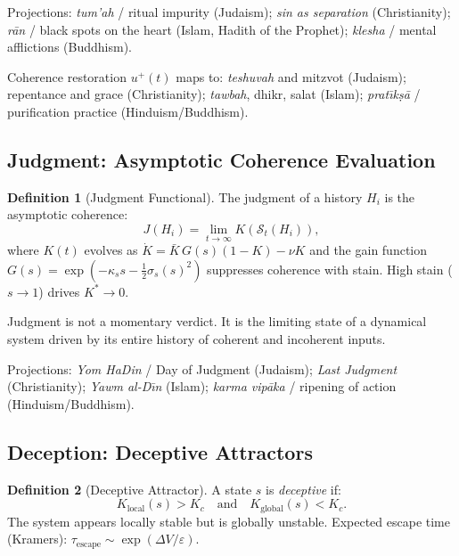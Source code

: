 \documentclass[12pt,oneside]{book}
\theoremstyle{definition}
\newtheorem{definition}{Definition}[chapter]
\begin{document}
\noindent Projections: \textit{tum'ah} / ritual impurity (Judaism);
\textit{sin as separation} (Christianity); \textit{r\={a}n} / black spots on the
heart (Islam, Hadith of the Prophet); \textit{klesha} / mental afflictions (Buddhism).

Coherence restoration $u^+(t)$ maps to: \textit{teshuvah} and mitzvot (Judaism);
repentance and grace (Christianity); \textit{tawbah}, dhikr, salat (Islam);
\textit{prat\={\i}k\d{s}\={a}} / purification practice (Hinduism/Buddhism).

\subsection{Judgment: Asymptotic Coherence Evaluation}

\begin{definition}[Judgment Functional]
  The judgment of a history $H_i$ is the asymptotic coherence:
  \begin{equation}
    J(H_i) = \lim_{t\to\infty} K(\mathcal{S}_t(H_i)),
  \end{equation}
  where $K(t)$ evolves as $\dot{K} = \bar{K}\,G(s)(1-K) - \nu K$ and the
  gain function $G(s) = \exp(-\kappa_s s - \tfrac{1}{2}\sigma_s(s)^2)$
  suppresses coherence with stain. High stain ($s\to1$) drives $K^*\to0$.
\end{definition}

Judgment is not a momentary verdict. It is the limiting state of a dynamical
system driven by its entire history of coherent and incoherent inputs.

\noindent Projections: \textit{Yom HaDin} / Day of Judgment (Judaism);
\textit{Last Judgment} (Christianity); \textit{Yawm al-D\={\i}n} (Islam);
\textit{karma vip\={a}ka} / ripening of action (Hinduism/Buddhism).

\subsection{Deception: Deceptive Attractors}

\begin{definition}[Deceptive Attractor]
  A state $s$ is \emph{deceptive} if:
  \begin{equation}
    K_{\mathrm{local}}(s) > K_c \quad \text{and} \quad K_{\mathrm{global}}(s) < K_c.
  \end{equation}
  The system appears locally stable but is globally unstable. Expected escape time
  (Kramers): $\tau_{\mathrm{escape}} \sim \exp(\Delta V/\varepsilon)$.
\end{definition}
\end{document}
